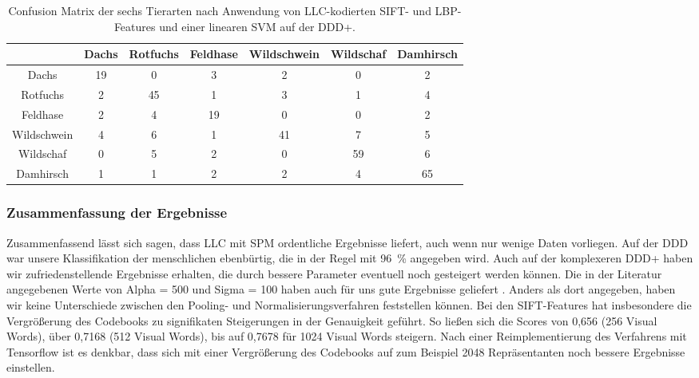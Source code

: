 \begin{table}
	\centering
	\begin{tabular}{|c|c|c|c|c|c|c|}
		\hline
		& Dachs & Rotfuchs & Feldhase & Wildschwein & Wildschaf & Damhirsch \\
		\hline
		Dachs & 19 & 0 & 3 & 2 & 0 & 2 \\ \hline
		Rotfuchs & 2 & 45 & 1 & 3 & 1 & 4 \\ \hline
		Feldhase & 2 & 4 & 19 & 0 & 0 & 2 \\ \hline
		Wildschwein & 4 & 6 & 1 & 41 & 7 & 5 \\ \hline
		Wildschaf & 0 & 5 & 2 & 0 & 59 & 6 \\ \hline
		Damhirsch & 1 & 1 & 2 & 2 & 4 & 65 \\
		\hline
	\end{tabular}
	\caption{Confusion Matrix der sechs Tierarten nach Anwendung von LLC-kodierten SIFT- und LBP-Features und einer linearen SVM auf der DDD+.}
	\label{tab:ddd+}
\end{table}

\subsubsection{Zusammenfassung der Ergebnisse}

Zusammenfassend lässt sich sagen, dass LLC mit SPM ordentliche Ergebnisse liefert, auch wenn nur wenige Daten vorliegen. Auf der DDD war unsere Klassifikation der menschlichen ebenbürtig, die in der Regel mit 96~\% angegeben wird. Auch auf der komplexeren DDD+ haben wir zufriedenstellende Ergebnisse erhalten, die durch bessere Parameter eventuell noch gesteigert werden können. Die in der Literatur angegebenen Werte von Alpha = 500 und Sigma = 100 haben auch für uns gute Ergebnisse geliefert \cite{wyylhg10}. Anders als dort angegeben, haben wir keine Unterschiede zwischen den Pooling- und Normalisierungsverfahren feststellen können. Bei den SIFT-Features hat insbesondere die Vergrößerung des Codebooks zu signifikaten Steigerungen in der Genauigkeit geführt. So ließen sich die Scores von 0,656 (256 Visual Words), über 0,7168 (512 Visual Words), bis auf 0,7678 für 1024 Visual Words steigern. Nach einer Reimplementierung des Verfahrens mit Tensorflow ist es denkbar, dass sich mit einer Vergrößerung des Codebooks auf zum Beispiel 2048 Repräsentanten noch bessere Ergebnisse einstellen.